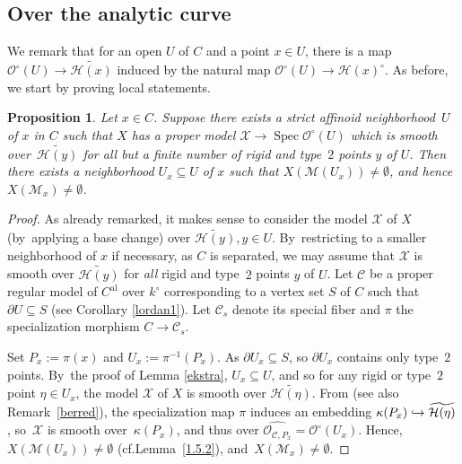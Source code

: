 \documentclass[10pt]{amsart}
\newcommand{\cf}{cf.}
\newcommand{\hto}{\mathrel{\lhook\joinrel\to}}
\newcommand{\al}{\mathrm{al}}
\DeclareMathOperator{\Spec}{Spec}
\newtheorem{prop}[thm]{Proposition}
\theoremstyle{definition}
\begin{document}
\subsection{Over the analytic curve} \label{ana}
We remark that for an open $U$ of $C$ and a point $x \in U$, there is a map $\mathcal{O}^{\circ}(U) \to \widetilde{\mathcal{H}(x)}$ induced by the natural map $\mathcal{O}^{\circ}(U) \to \mathcal{H}(x)^{\circ}$. As before, we start by proving local statements.

\begin{prop} \label{3.1}
Let $x \in C$. Suppose there exists a strict affinoid neighborhood~$U$ of $x$ in $C$ such that $X$ has a proper model $\mathcal{X} \to \Spec \mathcal{O}^{\circ}(U)$ which is smooth over~$\widetilde{\mathcal{H}(y)}$ for all but a finite number of rigid and type~$2$ points $y$ of $U$.
Then there exists a neighborhood $U_x \subseteq U$ of $x$ such that $X(\mathscr{M}(U_x)) \neq \emptyset$, and hence $X(\mathscr{M}_x) \neq \emptyset$.
\end{prop}

\begin{proof} As already remarked, it makes sense to consider the model $\mathcal{X}$ of $X$ (by~applying a base change) over $\widetilde{\mathcal{H}(y)}, y\in U$.
By~restricting to a smaller neighborhood of $x$ if necessary, as $C$ is separated, we may assume that $\mathcal{X}$ is smooth over $\widetilde{\mathcal{H}(y)}$ for \emph{all} rigid and type~$2$ points $y$ of $U$. Let $\mathscr{C}$ be a proper regular model of $C^{\al}$ over $k^{\circ}$ corresponding to a vertex set $S$ of $C$ such that $\partial{U} \subseteq S$ (see Corollary \ref{lordan1}). Let $\mathscr{C}_s$ denote its special fiber and $\pi$ the specialization morphism $C \to \mathscr{C}_s$.

Set $P_x:=\pi(x)$ and $U_x:=\pi^{-1}(P_x)$. As $\partial{U_x} \subseteq S$, so $\partial{U_x}$ contains only type~$2$ points.
By~the proof of Lemma \ref{ekstra}, $U_x \subseteq U$, and so for any rigid or type~$2$ point $\eta \in U_x$, the model $\mathcal{X}$ of $X$ is smooth over $\widetilde{\mathcal{H}(\eta)}$. From \cite[2.4, p.\,35]{Ber90} (see also Remark~\ref{berred}), the specialization map $\pi$ induces an embedding $\kappa(P_x) \hto \widetilde{\mathcal{H}(\eta)}$, so~$\mathcal{X}$ is smooth over~$\kappa(P_x)$, and thus over $\widehat{\mathcal{O}_{\mathscr{C}, P_x}}=\mathcal{O}^{\circ}(U_x)$. Hence, $X(\mathscr{M}(U_x)) \neq \emptyset$ (\cf Lemma~\ref{1.5.2}), and~$X(\mathscr{M}_x) \neq \emptyset$.
\end{proof}
\end{document}
